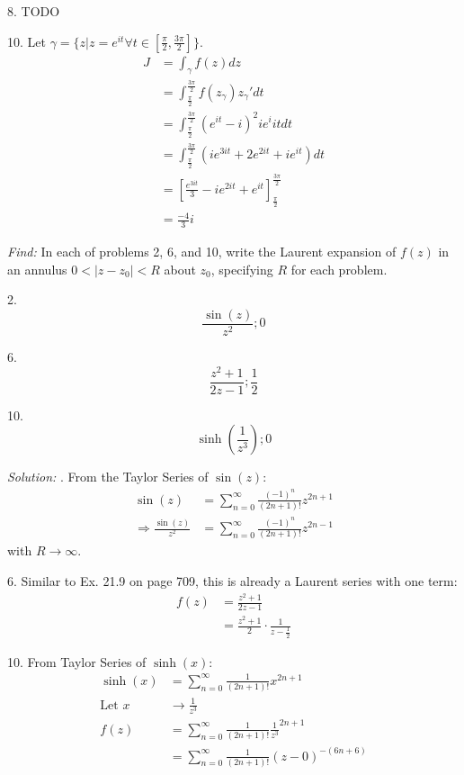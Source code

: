 \documentclass[11pt]{homework}
\begin{document}
8. TODO %


10. Let $\gamma = \{z | z = e^{it} \forall t\in[\frac{\pi}{2},\frac{3\pi}{2}]\}$.
\begin{align*}
  J &= \int_\gamma f(z) dz \\
    &= \int_\frac{\pi}{2}^{\frac{3\pi}{2}} f(z_\gamma) z_\gamma' dt   \\
    &= \int_\frac{\pi}{2}^{\frac{3\pi}{2}} (e^{it} - i)^2 ie^i{it} dt \\
    &= \int_\frac{\pi}{2}^{\frac{3\pi}{2}} (ie^{3it} + 2e^{2it} +ie^{it}) dt \\
    &= \left[ \frac{e^{3it}}{3} - i e^{2it} + e^{it} \right]_\frac{\pi}{2}^\frac{3\pi}{2} \\
    &= \frac{-4}{3}i
\end{align*}

\newpage
{}
\emph{Find:}
In each of problems 2, 6, and 10,
write the Laurent expansion of $f(z)$ in an annulus $0<|z-z_0|<R$
about $z_0$, specifying $R$ for each problem. 

2.
\begin{equation*}
  \frac{\sin(z)}{z^2}; 0
\end{equation*}

6.
\begin{equation*}
  \frac{z^2+1}{2z-1}; \frac{1}{2}
\end{equation*}

10.
\begin{equation*}
  \sinh(\frac{1}{z^3}); 0
\end{equation*}

\emph{Solution:}
. From the Taylor Series of $\sin(z)$:
\begin{align*}
\sin(z) &= \sum_{n=0}^\infty \frac{ (-1)^n}{(2n+1)!} z^{2n+1} \\
\Rightarrow 
  \frac{ \sin(z)}{z^2} &= \sum_{n=0}^\infty \frac{ (-1)^n}{(2n+1)!} z^{2n-1} 
\end{align*}
\noindent
with $R\rightarrow \infty$.

6. Similar to Ex. 21.9 on page 709, this is already a Laurent series with one term:
\begin{align*}
f(z) &= \frac{ z^2+1}{2z-1} \\
     &= \frac{ z^2+1}{2} \cdot \frac{1}{z-\frac{1}{2}} 
\end{align*}

10. From Taylor Series of $\sinh(x)$:
\begin{align*}
\sinh(x) &= \sum_{n=0}^\infty \frac{1 }{(2n+1)!} x^{2n+1} \\
\text{Let } x &\rightarrow  \frac{1}{z^3} \\ 
f(z) &=\sum_{n=0}^\infty \frac{ 1 }{(2n+1)!} \frac{1}{z^3}^{2n+1} \\
  &= \sum_{n=0}^\infty \frac{ 1 }{(2n+1)!} (z-0)^{-(6n+6)} 
\end{align*}
\end{document}

